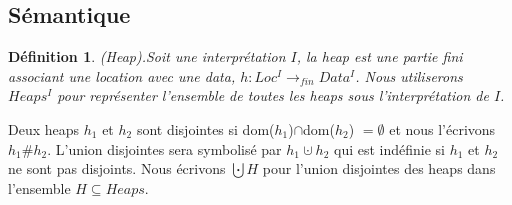 \documentclass[9pt]{book}
\newtheorem{definition}{D\'efinition}[section]
\begin{document}
	\subsection{S\'emantique}
	\begin{definition}
	(Heap).Soit une interpr\'etation $I$, la heap est une partie fini associant une location avec une data, $h : Loc^{I} \rightarrow_{fin} Data^{I}$. Nous utiliserons $Heaps^{I}$ pour repr\'esenter l'ensemble de toutes les heaps sous l'interpr\'etation de $I$.
	\end{definition}
	Deux heaps $h_{1}$ et $h_{2}$ sont disjointes si dom($h_{1}$)$\cap$dom($h_{2}$) $= \emptyset$ et nous l'\'ecrivons $h_{1}\#h_{2}$. L'union disjointes sera symbolis\'e par $h_{1}\cupdot h_{2}$ qui est ind\'efinie si $h_{1}$ et $h_{2}$ ne sont pas disjoints. Nous \'ecrivons $\bigcupdot H$ pour l'union disjointes des heaps dans l'ensemble $H \subseteq Heaps$.
\end{document}
